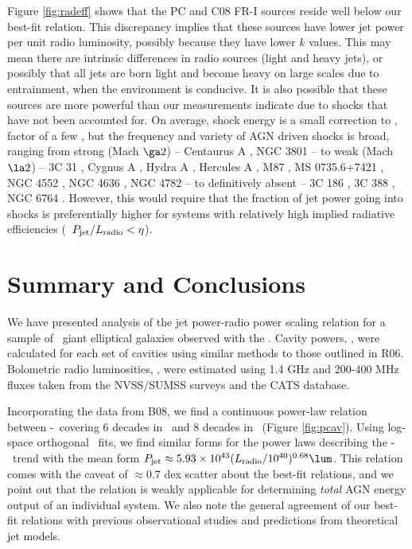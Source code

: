 \documentclass{emulateapj}
\begin{document}
Figure \ref{fig:radeff} shows that the PC and C08 FR-I sources reside
well below our best-fit relation. This discrepancy implies that these
sources have lower jet power per unit radio luminosity, possibly
because they have lower $k$ values. This may mean there are intrinsic
differences in radio sources (light and heavy jets), or possibly that
all jets are born light and become heavy on large scales due to
entrainment, when the environment is conducive. It is also possible
that these sources are more powerful than our measurements indicate
due to shocks that have not been accounted for. On average, shock
energy is a small correction to \pcav, factor of a few
\citep{mcnamrev}, but the frequency and variety of AGN driven shocks
is broad, ranging from strong (Mach $\ga 2$) -- Centaurus A
\citep{2003ApJ...592..129K, 2009MNRAS.395.1999C}, NGC 3801
\citep{2007ApJ...660..191C} -- to weak (Mach $\la 2$) -- 3C 31
\citep{2002MNRAS.336.1161L}, Cygnus A \citep{2006ApJ...644L...9W},
Hydra A \citep{hydraa}, Hercules A \citep{herca}, M87
\citep{2007ApJ...665.1057F}, MS 0735.6+7421 \citep{ms0735}, NGC 4552
\citep{2006ApJ...648..947M}, NGC 4636 \citep{2009arXiv0909.2942B}, NGC
4782 \citep{2007ApJ...664..804M} -- to definitively absent -- 3C
186 \citep{2008ApJ...684..811S}, 3C 388 \citep{2006ApJ...639..753K},
NGC 6764 \citep{2008ApJ...688..190C}. However, this would require that
the fraction of jet power going into shocks is preferentially higher
for systems with relatively high implied radiative efficiencies
(\ie\ $P_{\mathrm{jet}}/L_{\mathrm{radio}} < \eta$).

\section{Summary and Conclusions}
\label{sec:summary}

We have presented analysis of the jet power-radio power scaling
relation for a sample of \samp\ giant elliptical galaxies observed
with the \cxo. Cavity powers, \pjet, were calculated for each set of
cavities using similar methods to those outlined in R06. Bolometric
radio luminosities, \prad, were estimated using 1.4 GHz and 200-400
MHz fluxes taken from the NVSS/SUMSS surveys and the CATS database.

Incorporating the data from B08, we find a continuous power-law
relation between \pjet-\prad\ covering 6 decades in \prad\ and 8
decades in \pjet\ (Figure \ref{fig:pcav}). Using log-space orthogonal
\bces\ fits, we find similar forms for the power laws describing the
\pjet-\prad\ trend with the mean form $\pjet \approx 5.93\times10^{43}
(\prad/10^{40})^{0.68} \lum$. This relation comes with the caveat of
$\approx 0.7$ dex scatter about the best-fit relations, and we point
out that the relation is weakly applicable for determining
{\it{total}} AGN energy output of an individual system. We also note
the general agreement of our best-fit relations with previous
observational studies and predictions from theoretical jet models.
\end{document}
